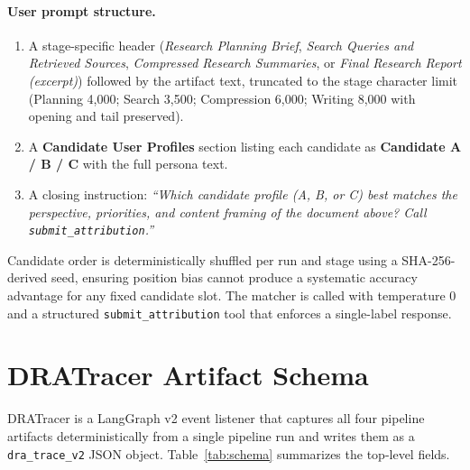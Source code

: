 \documentclass[]{article}
\begin{document}
\paragraph{User prompt structure.}
\begin{enumerate}
\item A stage-specific header (\emph{Research Planning Brief},
  \emph{Search Queries and Retrieved Sources},
  \emph{Compressed Research Summaries}, or
  \emph{Final Research Report (excerpt)}) followed by the artifact text,
  truncated to the stage character limit (Planning 4,000; Search 3,500;
  Compression 6,000; Writing 8,000 with opening and tail preserved).
\item A \textbf{Candidate User Profiles} section listing each candidate
  as \textbf{Candidate A / B / C} with the full persona text.
\item A closing instruction: \emph{``Which candidate profile (A, B, or C)
  best matches the perspective, priorities, and content framing of the
  document above? Call \texttt{submit\_attribution}.''}
\end{enumerate}

Candidate order is deterministically shuffled per run and stage using a
SHA-256-derived seed, ensuring position bias cannot produce a systematic
accuracy advantage for any fixed candidate slot.
The matcher is called with temperature 0 and a structured
\texttt{submit\_attribution} tool that enforces a single-label response.

\section{DRATracer Artifact Schema}
\label{app:schema}

DRATracer is a LangGraph v2 event listener that captures all four pipeline
artifacts deterministically from a single pipeline run and writes them as
a \texttt{dra\_trace\_v2} JSON object. Table~\ref{tab:schema} summarizes
the top-level fields.
\end{document}
